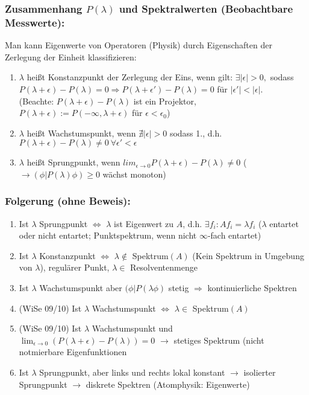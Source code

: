 \documentclass[twoside,a4paper]{scrartcl}
\renewcommand{\1}{\mathds{1}}
\newcommand{\Ra}{\Rightarrow}
\newcommand{\ra}{\rightarrow}
\renewcommand{\l}{\lambda}
\newcommand{\lra}{\Leftrightarrow}
\begin{document}
\subsubsection*{Zusammenhang $P(\lambda)$ und Spektralwerten (Beobachtbare Messwerte):}
Man kann Eigenwerte von Operatoren (Physik) durch Eigenschaften der Zerlegung der Einheit klassifizieren:
\begin{enumerate}
\item $\lambda$ heißt Konstanzpunkt der Zerlegung der Eins, wenn gilt: $\exists |\epsilon|>0,$ sodass $P(\lambda+\epsilon)-P(\lambda)=0 \Ra P(\lambda+\epsilon')-P(\lambda)=0$ für $|\epsilon'|<|\epsilon|$. \\
(Beachte: $P(\lambda+\epsilon)-P(\lambda)$ ist ein Projektor, $P(\lambda+\epsilon):=P(-\infty,\lambda+\epsilon)$ für $\epsilon< \epsilon_0$)
\item $\lambda$ heißt Wachstumspunkt, wenn $\nexists |\epsilon|>0$ sodass 1., d.h. $P(\lambda+\epsilon)-P(\lambda)\neq 0 \ \forall \epsilon'<\epsilon$
\item $\lambda$ heißt Sprungpunkt, wenn $lim_{\epsilon \ra 0}P(\lambda+\epsilon)-P(\lambda) \neq 0$ ($\ra (\phi|P(\lambda)\phi)\geq 0$ wächst monoton)
\end{enumerate}
\subsubsection*{Folgerung (ohne Beweis):}
\begin{enumerate}
\item Ist $\lambda$ Sprungpunkt $\lra $ $\lambda$ ist Eigenwert zu $A$, d.h. $\exists f_i: Af_i=\l f_i$ ($\l$ entartet oder nicht entartet; Punktspektrum, wenn nicht $\infty$-fach entartet)
\item Ist $\lambda$ Konstanzpunkt $\lra$  $\lambda \notin$ Spektrum$(A)$ (Kein Spektrum in Umgebung von $\lambda$), regulärer Punkt, $\l \in$ Resolventenmenge
\item Ist $\l$ Wachstumspunkt aber $(\phi|P(\lambda \phi)$ stetig $\Ra$ kontinuierliche Spektren
\item (WiSe 09/10) Ist $\l$ Wachstumspunkt $\lra$ $\l \in$ Spektrum$(A)$
\item (WiSe 09/10) Ist $\l$ Wachstumspunkt und $\lim_{\epsilon \ra 0}(P(\l+\epsilon)-P(\l))=0$ $\ra$ stetiges Spektrum (nicht notmierbare Eigenfunktionen 
\item Ist $\l$ Sprungpunkt, aber links und rechts lokal konstant $\ra$ isolierter Sprungpunkt $\ra$ diskrete Spektren (Atomphysik: Eigenwerte)
\end{enumerate}
\end{document}

